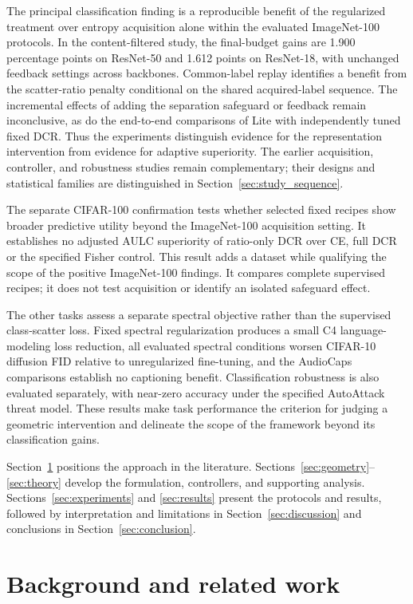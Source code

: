 \documentclass[10pt,a4paper,twocolumn]{article}
\begin{document}
The principal classification finding is a reproducible benefit of the
regularized treatment over entropy acquisition alone within the evaluated
ImageNet-100 protocols. In the content-filtered study, the final-budget
gains are 1.900 percentage points on ResNet-50 and 1.612 points on
ResNet-18, with unchanged feedback settings across backbones. Common-label
replay identifies a benefit from the scatter-ratio penalty conditional on
the shared acquired-label sequence. The incremental effects of adding
the separation safeguard or feedback remain inconclusive, as do the
end-to-end comparisons of Lite with independently tuned fixed DCR.
Thus the experiments distinguish evidence for the representation
intervention from evidence for adaptive superiority. The earlier
acquisition, controller, and robustness studies remain complementary;
their designs and statistical families are distinguished in
Section~\ref{sec:study_sequence}.

The separate CIFAR-100 confirmation tests whether selected fixed
recipes show broader predictive utility beyond the ImageNet-100
acquisition setting. It establishes no adjusted AULC superiority of
ratio-only DCR over CE, full DCR or the specified Fisher control.
This result adds a dataset while qualifying the scope of the positive
ImageNet-100 findings. It compares complete supervised recipes;
it does not test acquisition or identify an isolated safeguard effect.

The other tasks assess a separate spectral objective rather than the
supervised class-scatter loss. Fixed spectral regularization produces a
small C4 language-modeling loss reduction, all evaluated spectral
conditions worsen CIFAR-10 diffusion FID relative to unregularized
fine-tuning, and the AudioCaps comparisons establish no captioning
benefit. Classification robustness is also evaluated separately, with
near-zero accuracy under the specified AutoAttack threat model. These
results make task performance the criterion for judging a geometric
intervention and delineate the scope of the framework beyond its
classification gains.

Section~\ref{sec:background} positions the approach in the literature.
Sections~\ref{sec:geometry}--\ref{sec:theory} develop the formulation,
controllers, and supporting analysis.
Sections~\ref{sec:experiments} and \ref{sec:results} present the protocols
and results, followed by interpretation and limitations in
Section~\ref{sec:discussion} and conclusions in
Section~\ref{sec:conclusion}.

\section{Background and related work}\label{sec:background}
\end{document}
